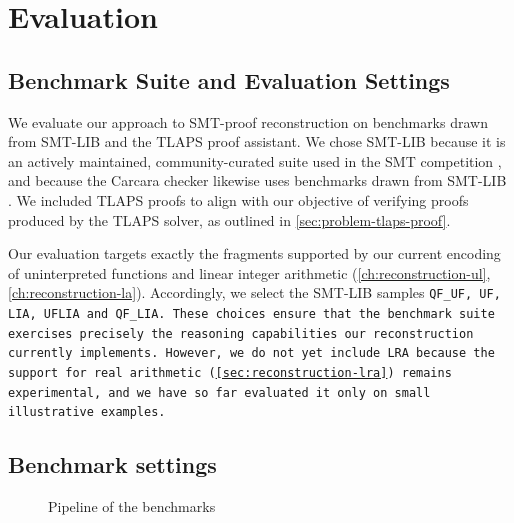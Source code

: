 \chapter{Evaluation}\label{ch:evaluation}


\section{Benchmark Suite and Evaluation Settings}
\label{sec:benchs-and-setting}

We evaluate our approach to SMT-proof reconstruction on benchmarks drawn from SMT-LIB and the TLAPS proof assistant.
We chose SMT-LIB because it is an actively maintained, community-curated suite used in the SMT competition \cite{SMT-COMP},
and because the Carcara checker likewise uses benchmarks drawn from SMT-LIB \cite[\S 4]{carcara}. We included TLAPS proofs to align with our objective of verifying proofs produced by the TLAPS solver, as outlined in \cref{sec:problem-tlaps-proof}.

Our evaluation targets exactly the fragments supported by our current encoding of uninterpreted functions and linear integer arithmetic (\cref{ch:reconstruction-ul}, \cref{ch:reconstruction-la}).
Accordingly, we select the SMT-LIB samples \tt{QF\_UF}, \tt{UF}, \tt{LIA},  \tt{UFLIA} and \tt{QF\_LIA}.
These choices ensure that the benchmark suite exercises precisely the reasoning capabilities our reconstruction currently implements.
However, we do not yet include \tt{LRA} because the support for real arithmetic (\cref{sec:reconstruction-lra}) remains experimental, and we have so far evaluated it only on small illustrative examples.

\section{Benchmark settings}
\label{sec:benchmark-settings}

\begin{figure}[h]
\caption{Pipeline of the benchmarks}
\label{fig:bench-pipeline}
\end{figure}


